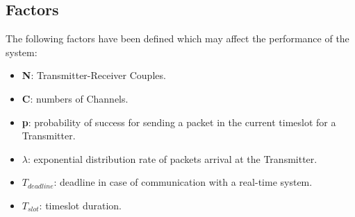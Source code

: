 \subsection{Factors}
The following factors have been defined which may affect the performance of the system:
\begin{itemize}
	\item \textbf{N}: Transmitter-Receiver Couples.
	\item \textbf{C}: numbers of Channels.
	\item \textbf{p}: probability of success for sending a packet in the current timeslot for a Transmitter.
	\item \textbf{$\lambda$}: exponential distribution rate of packets arrival at the Transmitter.
	\item $T_{deadline}$: deadline in case of communication with a real-time system.
	\item $T_{slot}$: timeslot duration.
	
\end{itemize}